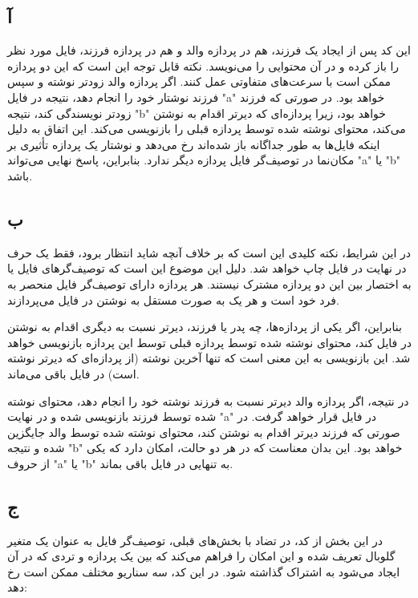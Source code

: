 \subsection*{آ}
این کد پس از ایجاد یک فرزند، هم در پردازه والد و هم در پردازه فرزند، فایل مورد نظر را باز کرده و در آن محتوایی را می‌نویسد. نکته قابل توجه این است که این دو پردازه ممکن است با سرعت‌های متفاوتی عمل کنند. اگر پردازه والد زودتر نوشته و سپس فرزند نوشتار خود را انجام دهد، نتیجه در فایل "a" خواهد بود. در صورتی که فرزند زودتر نویسندگی کند، نتیجه "b" خواهد بود، زیرا پردازه‌ای که دیرتر اقدام به نوشتن می‌کند، محتوای نوشته شده توسط پردازه قبلی را بازنویسی می‌کند. این اتفاق به دلیل اینکه فایل‌ها به طور جداگانه باز شده‌اند رخ می‌دهد و نوشتار یک پردازه تأثیری بر مکان‌نما  در توصیف‌گر فایل  پردازه دیگر ندارد. بنابراین، پاسخ نهایی می‌تواند "a" یا "b" باشد.

\subsection*{ب}
در این شرایط، نکته کلیدی این است که بر خلاف آنچه شاید انتظار برود، فقط یک حرف در نهایت در فایل چاپ خواهد شد. دلیل این موضوع این است که توصیف‌گرهای فایل  یا به اختصار  بین این دو پردازه مشترک نیستند. هر پردازه دارای توصیف‌گر فایل منحصر به فرد خود است و هر یک به صورت مستقل به نوشتن  در فایل می‌پردازند.

بنابراین، اگر یکی از پردازه‌ها، چه پدر یا فرزند، دیرتر نسبت به دیگری اقدام به نوشتن در فایل کند، محتوای نوشته شده توسط پردازه قبلی توسط این پردازه بازنویسی خواهد شد. این بازنویسی به این معنی است که تنها آخرین نوشته (از پردازه‌ای که دیرتر نوشته است) در فایل باقی می‌ماند.

در نتیجه، اگر پردازه والد دیرتر نسبت به فرزند نوشته خود را انجام دهد، محتوای نوشته شده توسط فرزند بازنویسی شده و در نهایت "a" در فایل قرار خواهد گرفت. در صورتی که فرزند دیرتر اقدام به نوشتن کند، محتوای نوشته شده توسط والد جایگزین شده و نتیجه "b" خواهد بود. این بدان معناست که در هر دو حالت، امکان دارد که یکی از حروف "a" یا "b" به تنهایی در فایل باقی بماند.

\subsection*{ج}
در این بخش از کد، در تضاد با بخش‌های قبلی، توصیف‌گر فایل  به عنوان یک متغیر گلوبال تعریف شده و این امکان را فراهم می‌کند که بین یک پردازه و تردی که در آن ایجاد می‌شود به اشتراک گذاشته شود. در این کد، سه سناریو مختلف ممکن است رخ دهد:

